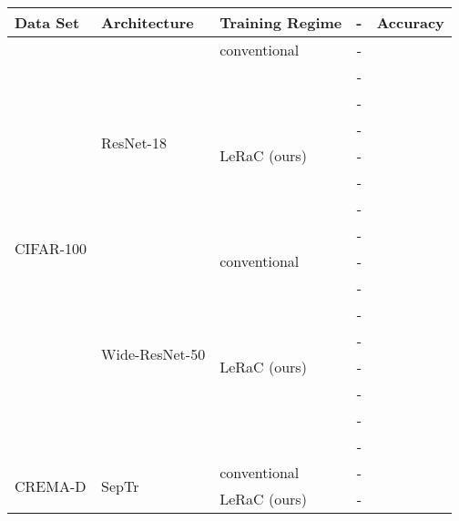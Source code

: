 \documentclass[10pt,twocolumn,letterpaper]{article}
\begin{document}
\begin{table*}[t]
  \small{
\begin{center}
  \begin{tabular}{lllcc}
    \toprule
    Data Set & Architecture  & Training Regime & -     & Accuracy \\
    \midrule
    \multirow{16}{*}{\vspace{-0.52cm}CIFAR-100}  & \multirow{8}{*}{ResNet-18}              & conventional    & - &  \\
    \cmidrule{3-5}
                                &      & \multirow{7}{*}{LeRaC (ours)} & -             & \\
                                &               &  & -             & \\
                                &               &  & -             & \\
                                &               &  & -             & \\
                                &               & & -             & \\
                                &               &  & -             & \\
                                &               &  & -             & \\
    \cmidrule{2-5}
                                & \multirow{8}{*}{Wide-ResNet-50}              & conventional & -            &  \\
    \cmidrule{3-5}
                       &      & \multirow{7}{*}{LeRaC (ours)} & -            & \\
                                 &               &  & -             & \\
                                &               &  & -             & \\
                                &               &  & -             & \\
                                &               &  & -             & \\
                                &               &  & -             & \\
                                &               &  & -             & \\
    \midrule
   \multirow{7}{*}{CREMA-D} &   \multirow{7}{*}{SepTr}   & conventional                   & - &        \\
    \cmidrule{3-5}
    &      & \multirow{6}{*}{LeRaC (ours)}                    & - &  \\

\end{tabular}
\end{center}}
\end{table*}
\end{document}
